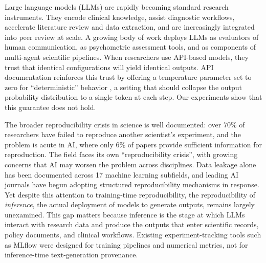 \documentclass[sn-nature]{sn-jnl}
\providecommand{\DIFadd}[1]{{\protect\color{blue}\uwave{#1}}} %
\providecommand{\DIFaddbegin}{} %
\providecommand{\DIFaddend}{} %
\providecommand{\DIFaddincludegraphics}[2][]{{\color{blue}\fbox{\DIFOincludegraphics[#1]{#2}}}} %
\DeclareRobustCommand{\DIFaddbegin}{\DIFOaddbegin \let\includegraphics\DIFaddincludegraphics} %
\DeclareRobustCommand{\DIFaddend}{\DIFOaddend \let\includegraphics\DIFOincludegraphics} %
\begin{document}

\maketitle

\linenumbers


Large language models (LLMs) are rapidly becoming standard research instruments.
They encode clinical knowledge\cite{singhal2023large}, assist diagnostic workflows\cite{thirunavukarasu2023large}, accelerate literature review and data extraction\cite{birhane2023science}, and are increasingly integrated into peer review at scale\cite{thakkar2026llm}.
A growing body of work deploys LLMs as evaluators of human communication\cite{kumar2026reliable}, as psychometric assessment tools\cite{serapiogarcía2025psychometric}, and as components of multi-agent scientific pipelines\cite{xin2025agentic}.
When researchers use API-based models, they trust that identical configurations will yield identical outputs.
API documentation reinforces this trust by offering a temperature parameter set to zero for ``deterministic'' behavio\DIFaddbegin \DIFadd{u}\DIFaddend r , a setting that should collapse the output probability distribution to a single token at each step.
Our experiments show that this guarantee does not hold.

The broader reproducibility crisis in science is well documented: over 70\% of researchers have failed to reproduce another scientist's experiment\cite{baker2016reproducibility}, and the problem is acute in AI, where only 6\% of papers provide sufficient information for reproduction\cite{gundersen2018state}.
The field faces its own ``reproducibility crisis''\cite{hutson2018artificial}, with growing concerns that AI may worsen the problem across disciplines\cite{ball2023ai}.
Data leakage alone has been documented across 17 machine learning subfields\cite{kapoor2023leakage}, and leading AI journals have begun adopting structured reproducibility mechanisms in response\cite{gundersen2024improving}.
Yet despite this attention to training-time reproducibility, the reproducibility of \emph{inference}, the actual deployment of models to generate outputs, remains largely unexamined.
This gap matters because inference is the stage at which LLMs interact with research data and produce the outputs that enter scientific records, policy documents, and clinical workflows.
Existing experiment-tracking tools such as MLflow\cite{zaharia2018accelerating} were designed for training pipelines and numerical metrics, not for inference-time text-generation provenance.
\end{document}

